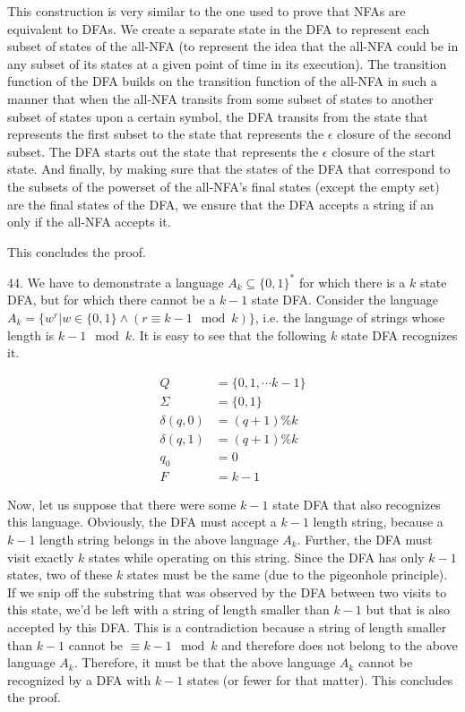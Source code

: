 \documentclass{article}
\begin{document}
This construction is very similar to the one used to prove that NFAs are equivalent to DFAs. We create a separate state in the DFA to represent each subset of states of the all-NFA (to represent the idea that the all-NFA could be in any subset of its states at a given point of time in its execution). The transition function of the DFA builds on the transition function of the all-NFA in such a manner that when the all-NFA transits from some subset of states to another subset of states upon a certain symbol, the DFA transits from the state that represents the first subset to the state that represents the $\epsilon$ closure of the second subset. The DFA starts out the state that represents the $\epsilon$ closure of the start state. And finally, by making sure that the states of the DFA that correspond to the subsets of the powerset of the all-NFA's final states (except the empty set) are the final states of the DFA, we ensure that the DFA accepts a string if an only if the all-NFA accepts it.

This concludes the proof.

44. We have to demonstrate a language $A_k \subseteq \{0, 1\}^*$ for which there is a $k$ state DFA, but for which there cannot be a $k - 1$ state DFA. Consider the language $A_k = \{w^r | w \in \{0, 1\} \land (r \equiv {k - 1} \mod k) \}$, i.e. the language of strings whose length is $k - 1 \mod k$. It is easy to see that the following $k$ state DFA recognizes it. 

\begin{align*}
    Q             &= \{0, 1, \cdots {k - 1}\} \\
    \Sigma        &= \{0, 1\} \\
    \delta(q, 0)  &= (q + 1) \% k \\
    \delta(q, 1)  &= (q + 1) \% k \\
    q_0           &= 0 \\
    F             &= k - 1
\end{align*}

Now, let us suppose that there were some $k - 1$ state DFA that also recognizes this language. Obviously, the DFA must accept a $k - 1$ length string, because a $k - 1$ length string belongs in the above language $A_k$. Further, the DFA must visit exactly $k$ states while operating on this string. Since the DFA has only $k - 1$ states, two of these $k$ states must be the same (due to the pigeonhole principle). If we snip off the substring that was observed by the DFA between two visits to this state, we'd be left with a string of length smaller than $k - 1$ but that is also accepted by this DFA. This is a contradiction because a string of length smaller than $k - 1$ cannot be $\equiv {k - 1} \mod k$ and therefore does not belong to the above language $A_k$. Therefore, it must be that the above language $A_k$ cannot be recognized by a DFA with $k - 1$ states (or fewer for that matter). This concludes the proof.
\end{document}
